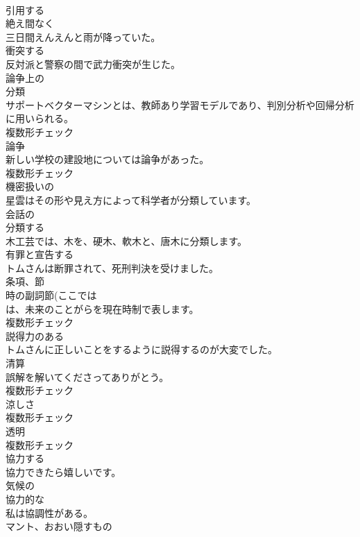 \documentclass[8pt]{extreport}
\begin{document}
\begin{CJK}{UTF8}{min}
\\	[動詞]	引用する	
\\	[副詞]	絶え間なく	
\\	三日間えんえんと雨が降っていた。	
\\	[動詞]	衝突する	
\\	反対派と警察の間で武力衝突が生じた。	
\\	[形容詞]	論争上の	
\\	[名詞]	分類	
\\	サポートベクターマシンとは、教師あり学習モデルであり、判別分析や回帰分析に用いられる。	
\\	複数形チェック
\\	[名詞]	論争	
\\	新しい学校の建設地については論争があった。	
\\	複数形チェック
\\	[形容詞]	機密扱いの	
\\	星雲はその形や見え方によって科学者が分類しています。	
\\	[形容詞]	会話の	
\\	[動詞]	分類する	
\\	木工芸では、木を、硬木、軟木と、唐木に分類します。	
\\	[動詞]	有罪と宣告する	
\\	トムさんは断罪されて、死刑判決を受けました。	
\\	[名詞]	条項、節	
\\	時の副詞節(ここでは
\\	は、未来のことがらを現在時制で表します。	
\\	複数形チェック
\\	[形容詞]	説得力のある	
\\	トムさんに正しいことをするように説得するのが大変でした。	
\\	[名詞]	清算	
\\	誤解を解いてくださってありがとう。	
\\	複数形チェック
\\	[名詞]	涼しさ	
\\	複数形チェック
\\	[名詞]	透明	
\\	複数形チェック
\\	[動詞]	協力する	
\\	協力できたら嬉しいです。	
\\	[形容詞]	気候の	
\\	[形容詞]	協力的な	
\\	私は協調性がある。	
\\	[名詞]	マント、おおい隠すもの	

\end{CJK}
\end{document}
